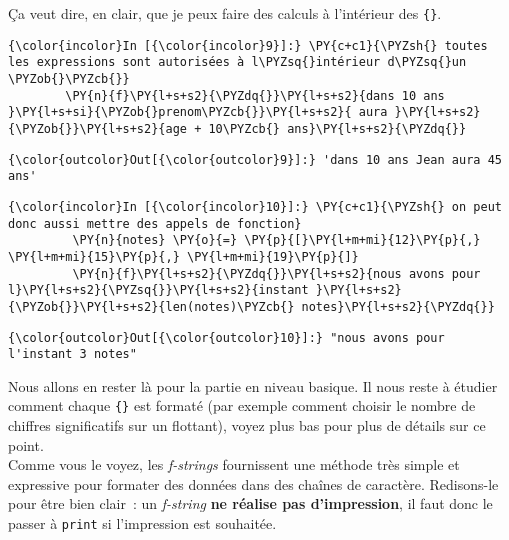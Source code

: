     Ça veut dire, en clair, que je peux faire des calculs à l'intérieur des
\texttt{\{\}}.

    \begin{Verbatim}[commandchars=\\\{\}]
{\color{incolor}In [{\color{incolor}9}]:} \PY{c+c1}{\PYZsh{} toutes les expressions sont autorisées à l\PYZsq{}intérieur d\PYZsq{}un \PYZob{}\PYZcb{}}
        \PY{n}{f}\PY{l+s+s2}{\PYZdq{}}\PY{l+s+s2}{dans 10 ans }\PY{l+s+si}{\PYZob{}prenom\PYZcb{}}\PY{l+s+s2}{ aura }\PY{l+s+s2}{\PYZob{}}\PY{l+s+s2}{age + 10\PYZcb{} ans}\PY{l+s+s2}{\PYZdq{}}
\end{Verbatim}


\begin{Verbatim}[commandchars=\\\{\}]
{\color{outcolor}Out[{\color{outcolor}9}]:} 'dans 10 ans Jean aura 45 ans'
\end{Verbatim}
            
    \begin{Verbatim}[commandchars=\\\{\}]
{\color{incolor}In [{\color{incolor}10}]:} \PY{c+c1}{\PYZsh{} on peut donc aussi mettre des appels de fonction}
         \PY{n}{notes} \PY{o}{=} \PY{p}{[}\PY{l+m+mi}{12}\PY{p}{,} \PY{l+m+mi}{15}\PY{p}{,} \PY{l+m+mi}{19}\PY{p}{]}
         \PY{n}{f}\PY{l+s+s2}{\PYZdq{}}\PY{l+s+s2}{nous avons pour l}\PY{l+s+s2}{\PYZsq{}}\PY{l+s+s2}{instant }\PY{l+s+s2}{\PYZob{}}\PY{l+s+s2}{len(notes)\PYZcb{} notes}\PY{l+s+s2}{\PYZdq{}}
\end{Verbatim}


\begin{Verbatim}[commandchars=\\\{\}]
{\color{outcolor}Out[{\color{outcolor}10}]:} "nous avons pour l'instant 3 notes"
\end{Verbatim}
            
    Nous allons en rester là pour la partie en niveau basique. Il nous reste
à étudier comment chaque \texttt{\{\}} est formaté (par exemple comment
choisir le nombre de chiffres significatifs sur un flottant), voyez plus
bas pour plus de détails sur ce point.\\

Comme vous le voyez, les \emph{f-strings} fournissent une méthode très
simple et expressive pour formater des données dans des chaînes de
caractère. Redisons-le pour être bien clair~: un \emph{f-string}
\textbf{ne réalise pas d'impression}, il faut donc le passer à
\texttt{print} si l'impression est souhaitée.

